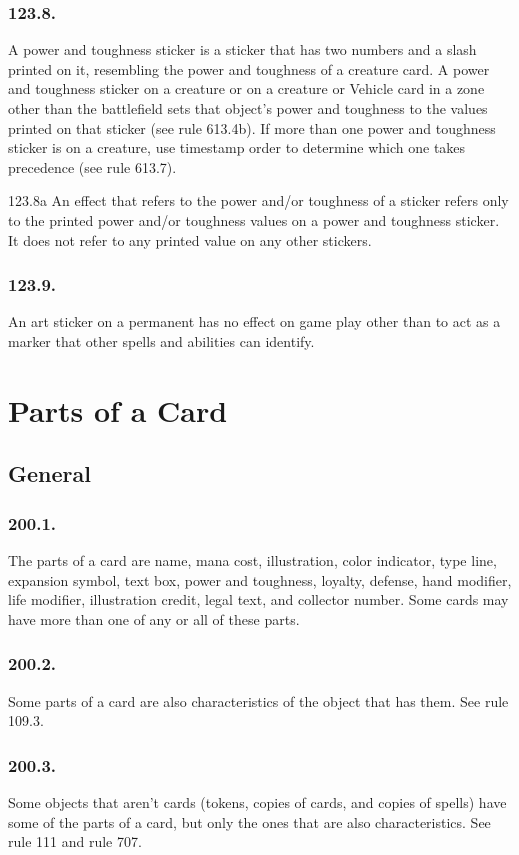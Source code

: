 \subsection*{123.8.}
A power and toughness sticker is a sticker that has two numbers and a slash printed on it, resembling the power and toughness of a creature card. A power and toughness sticker on a creature or on a creature or Vehicle card in a zone other than the battlefield sets that object’s power and toughness to the values printed on that sticker (see rule 613.4b). If more than one power and toughness sticker is on a creature, use timestamp order to determine which one takes precedence (see rule 613.7).

123.8a An effect that refers to the power and/or toughness of a sticker refers only to the printed power and/or toughness values on a power and toughness sticker. It does not refer to any printed value on any other stickers.

\subsection*{123.9.}
An art sticker on a permanent has no effect on game play other than to act as a marker that other spells and abilities can identify.

\chapter{Parts of a Card}
\setcounter{section}{199}
\section{General}
\subsection*{200.1.}
The parts of a card are name, mana cost, illustration, color indicator, type line, expansion symbol, text box, power and toughness, loyalty, defense, hand modifier, life modifier, illustration credit, legal text, and collector number. Some cards may have more than one of any or all of these parts.

\subsection*{200.2.}
Some parts of a card are also characteristics of the object that has them. See rule 109.3.

\subsection*{200.3.}
Some objects that aren’t cards (tokens, copies of cards, and copies of spells) have some of the parts of a card, but only the ones that are also characteristics. See rule 111 and rule 707.


